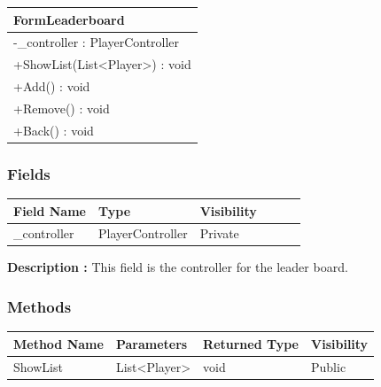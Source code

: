 \documentclass[12pt]{article}
\begin{document}
\begin{table}[H]
    \begin{tabular}{|l|}
    \hline
    \rowcolor[HTML]{C0C0C0} 
    \textbf{FormLeaderboard}                                    \\ \hline
    \rowcolor[HTML]{EFEFEF} 
    -\_controller : PlayerController                      \\ \hline
    \rowcolor[HTML]{FFFFFF} 
    +ShowList(List\textless{}{}Player\textgreater{}{}) : void \\ \hline
    +Add() : void                                         \\ \hline
    +Remove() : void                                      \\ \hline
    +Back() : void                                        \\ \hline
    \end{tabular}
\end{table}

\subsubsection{Fields}

\begin{table}[H]
    \begin{tabular}{llllll}
    \hline
    \multicolumn{1}{|l|}{\cellcolor[HTML]{EFEFEF}\textbf{Field Name}} & \multicolumn{1}{l|}{\cellcolor[HTML]{EFEFEF}\textbf{Type}} & \multicolumn{1}{l|}{\cellcolor[HTML]{EFEFEF}\textbf{Visibility}} \\ \hline
    \multicolumn{1}{|l|}{\_controller}                                & \multicolumn{1}{l|}{PlayerController}                        & \multicolumn{1}{l|}{Private}                                     \\ \hline
    \end{tabular}
\end{table}

\textbf{Description :} This field is the controller for the leader board.

\subsubsection{Methods}

\begin{table}[H]
    \begin{tabular}{|l|l|l|l|}
    \hline
    \rowcolor[HTML]{EFEFEF} 
    \cellcolor[HTML]{EFEFEF}\textbf{Method Name} & \textbf{Parameters}                    & \textbf{Returned Type} & \textbf{Visibility} \\ \hline
    ShowList                                     & List\textless{}Player\textgreater{}    & void                   & Public             \\ \hline
    \end{tabular}
\end{table}
\end{document}
